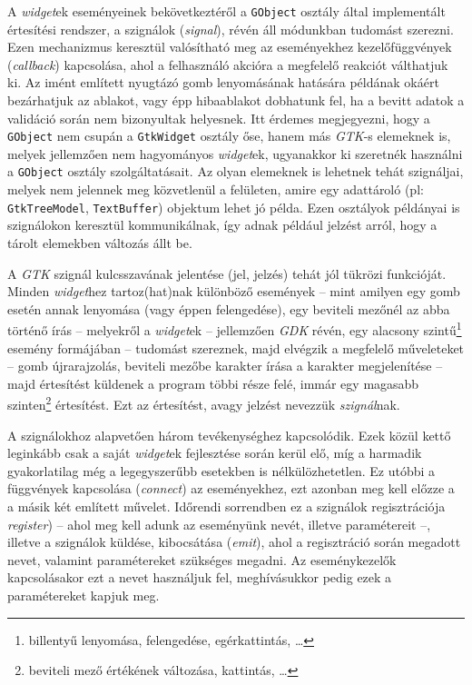 A \textit{widget}ek eseményeinek bekövetkeztéről a \texttt{GObject} osztály által implementált értesítési rendszer, a szignálok (\textit{signal}), révén áll módunkban tudomást szerezni. Ezen mechanizmus keresztül valósítható meg az eseményekhez kezelőfüggvények (\textit{callback}) kapcsolása, ahol a felhasználó akcióra a megfelelő reakciót válthatjuk ki. Az imént említett nyugtázó gomb lenyomásának hatására példának okáért bezárhatjuk az ablakot, vagy épp hibaablakot dobhatunk fel, ha a bevitt adatok a validáció során nem bizonyultak helyesnek. Itt érdemes megjegyezni, hogy a \texttt{GObject} nem csupán a \texttt{GtkWidget} osztály őse, hanem más \textit{GTK}-s elemeknek is, melyek jellemzően nem hagyományos \textit{widget}ek, ugyanakkor ki szeretnék használni a \texttt{GObject} osztály szolgáltatásait. Az olyan elemeknek is lehetnek tehát szignáljai, melyek nem jelennek meg közvetlenül a felületen, amire egy adattároló (pl: \texttt{GtkTreeModel}, \texttt{TextBuffer}) objektum lehet jó példa. Ezen osztályok példányai is szignálokon keresztül kommunikálnak, így adnak például jelzést arról, hogy a tárolt elemekben változás állt be.

A \textit{GTK} szignál kulcsszavának jelentése (jel, jelzés) tehát jól tükrözi funkcióját. Minden \textit{widget}hez tartoz(hat)nak különböző események -- mint amilyen egy gomb esetén annak lenyomása (vagy éppen felengedése), egy beviteli mezőnél az abba történő írás -- melyekről a \textit{widget}ek -- jellemzően \textit{GDK} révén, egy alacsony szintű\footnote{billentyű lenyomása, felengedése, egérkattintás, \dots} esemény formájában -- tudomást szereznek, majd elvégzik a megfelelő műveleteket -- gomb újrarajzolás, beviteli mezőbe karakter írása a karakter megjelenítése -- majd értesítést küldenek a program többi része felé, immár egy magasabb szinten\footnote{beviteli mező értékének változása, kattintás, \dots} értesítést. Ezt az értesítést, avagy jelzést nevezzük \textit{szignál}nak.

A szignálokhoz alapvetően három tevékenységhez kapcsolódik. Ezek közül kettő leginkább csak a saját \textit{widget}ek fejlesztése során kerül elő, míg a harmadik gyakorlatilag még a legegyszerűbb esetekben is nélkülözhetetlen. Ez utóbbi a függvények kapcsolása (\textit{connect}) az eseményekhez, ezt azonban meg kell előzze a a másik két említett művelet. Időrendi sorrendben ez a szignálok regisztrációja \textit{register}) -- ahol meg kell adunk az eseményünk nevét, illetve paramétereit --, illetve a szignálok küldése, kibocsátása (\textit{emit}), ahol a regisztráció során megadott nevet, valamint paramétereket szükséges megadni. Az eseménykezelők kapcsolásakor ezt a nevet használjuk fel, meghívásukkor pedig ezek a paramétereket kapjuk meg.

